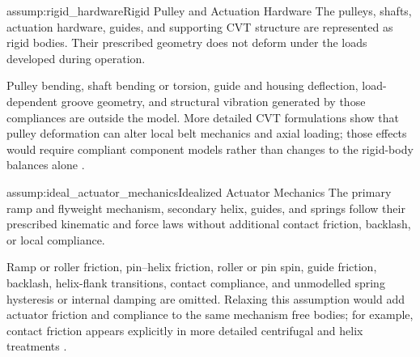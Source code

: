 \documentclass[11pt]{report}
\numberwithin{equation}{section}
\newcounter{assump}
\begin{document}
\begin{assumptionblock}{assump:rigid_hardware}{Rigid Pulley and Actuation Hardware}
The pulleys, shafts, actuation hardware, guides, and supporting CVT structure
are represented as rigid bodies. Their prescribed geometry does not deform
under the loads developed during operation.

\AssumptionConsequences
Pulley bending, shaft bending or torsion, guide and housing deflection,
load-dependent groove geometry, and structural vibration generated by those
compliances are outside the model. More detailed CVT formulations show that
pulley deformation can alter local belt mechanics and axial loading; those
effects would require compliant component models rather than changes to the
rigid-body balances alone
\citep{CarboneMangialardiMantriota2005,DuanEtAl2016}.
\end{assumptionblock}

\begin{assumptionblock}{assump:ideal_actuator_mechanics}{Idealized Actuator Mechanics}
The primary ramp and flyweight mechanism, secondary helix, guides, and springs
follow their prescribed kinematic and force laws without additional contact
friction, backlash, or local compliance.

\AssumptionConsequences
Ramp or roller friction, pin--helix friction, roller or pin spin, guide
friction, backlash, helix-flank transitions, contact compliance, and unmodelled
spring hysteresis or internal damping are omitted. Relaxing this assumption
would add actuator friction and compliance to the same mechanism free bodies;
for example, contact friction appears explicitly in more detailed centrifugal
and helix treatments
\citep{KimEtAl2002,SorgeCammalleri2011}.
\end{assumptionblock}
\end{document}
